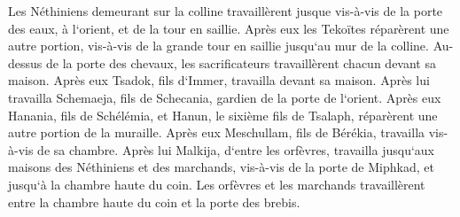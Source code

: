 \verse Les Néthiniens demeurant sur la colline travaillèrent jusque vis-à-vis de la porte des eaux, à l`orient, et de la tour en saillie. 
\verse Après eux les Tekoïtes réparèrent une autre portion, vis-à-vis de la grande tour en saillie jusqu`au mur de la colline. 
\verse Au-dessus de la porte des chevaux, les sacrificateurs travaillèrent chacun devant sa maison. 
\verse Après eux Tsadok, fils d`Immer, travailla devant sa maison. Après lui travailla Schemaeja, fils de Schecania, gardien de la porte de l`orient. 
\verse Après eux Hanania, fils de Schélémia, et Hanun, le sixième fils de Tsalaph, réparèrent une autre portion de la muraille. Après eux Meschullam, fils de Bérékia, travailla vis-à-vis de sa chambre. 
\verse Après lui Malkija, d`entre les orfèvres, travailla jusqu`aux maisons des Néthiniens et des marchands, vis-à-vis de la porte de Miphkad, et jusqu`à la chambre haute du coin. 
\verse Les orfèvres et les marchands travaillèrent entre la chambre haute du coin et la porte des brebis. 

